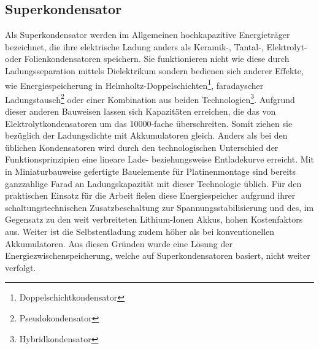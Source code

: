 \documentclass[12pt]{scrreprt} %
\begin{document}
\subsection{Superkondensator}
Als Superkondensator werden im Allgemeinen hochkapazitive Energieträger bezeichnet, die ihre elektrische Ladung anders als Keramik-, Tantal-, Elektrolyt- oder Folienkondensatoren speichern. Sie funktionieren nicht wie diese durch Ladungsseparation mittels Dielektrikum sondern bedienen sich anderer Effekte, wie Energiespeicherung in Helmholtz-Doppelschichten\footnote{Doppelschichtkondensator}, faradayscher Ladungstausch\footnote{Pseudokondensator} oder einer Kombination aus beiden Technologien\footnote{Hybridkondensator}. Aufgrund dieser anderen Bauweisen lassen sich Kapazitäten erreichen, die das von Elektrolytkondensatoren um das 10000-fache überschreiten. Somit ziehen sie bezüglich der Ladungsdichte mit Akkumulatoren gleich. Anders als bei den üblichen Kondensatoren wird durch den technologischen Unterschied der Funktionsprinzipien eine lineare Lade- beziehungsweise Entladekurve erreicht. Mit in Miniaturbauweise gefertigte Bauelemente für Platinenmontage sind bereits ganzzahlige Farad an Ladungskapazität mit dieser Technologie üblich. Für den praktischen Einsatz für die Arbeit fielen diese Energiespeicher aufgrund ihrer schaltungstechnischen Zusatzbeschaltung zur Spannungsstabilisierung und des, im Gegensatz zu den weit verbreiteten Lithium-Ionen Akkus, hohen Kostenfaktors aus. Weiter ist die Selbstentladung zudem höher als bei konventionellen Akkumulatoren. Aus diesen Gründen wurde eine Lösung der Energiezwischenspeicherung, welche auf Superkondensatoren basiert, nicht weiter verfolgt.
\end{document}
